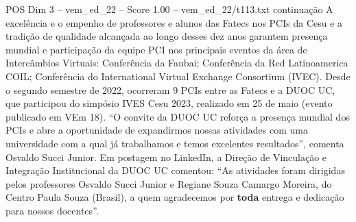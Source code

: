 \begin{textsample}{POS Dim 3 – vem\_ed\_22 – Score 1.00 – vem\_ed\_22/t113.txt}  \label{ex:f3_pos_045}
continuação A excelência e o empenho de professores e alunos das Fatecs nos PCIs da Cesu e a tradição de qualidade alcançada ao longo desses dez anos garantem presença mundial e participação da equipe PCI nos principais eventos da área de Intercâmbios Virtuais: Conferência da Faubai; Conferência da Red Latinoamerica COIL; Conferência do International Virtual Exchange Consortium (IVEC).
Desde o segundo semestre de 2022, ocorreram 9 PCIs entre as Fatecs e a DUOC UC, que participou do simpósio IVES Cesu 2023, realizado em 25 de maio (evento publicado em VEm 18). “O convite da DUOC UC reforça a presença mundial dos PCIs e abre a oportunidade de expandirmos nossas atividades com uma universidade com a qual já trabalhamos e temos excelentes resultados”, comenta Osvaldo Succi Junior.
Em postagem no LinkedIn, a Direção de Vinculação e Integração Institucional da DUOC UC comentou: “As atividades foram dirigidas pelos professores Osvaldo Succi Junior e Regiane Souza Camargo Moreira, do Centro Paula Souza (Brasil), a quem agradecemos por \textbf{toda} entrega e dedicação para nossos docentes”.

\end{textsample}
